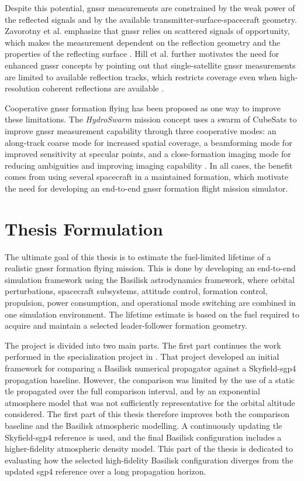 Despite this potential, \gls{gnssr} measurements are constrained by the weak power of the reflected signals and by the available transmitter-surface-spacecraft geometry. Zavorotny et al. emphasize that \gls{gnssr} relies on scattered signals of opportunity, which makes the measurement dependent on the reflection geometry and the properties of the reflecting surface \cite{zavorotny2014tutorial}. Hill et al. further motivates the need for enhanced \gls{gnssr} concepts by pointing out that single-satellite \gls{gnssr} measurements are limited to available reflection tracks, which restricts coverage even when high-resolution coherent reflections are available \cite{hill2025hydroswarm}.

Cooperative \gls{gnssr} formation flying has been proposed as one way to improve these limitations. The \textit{HydroSwarm} mission concept uses a swarm of CubeSats to improve \gls{gnssr} measurement capability through three cooperative modes: an along-track coarse mode for increased spatial coverage, a beamforming mode for improved sensitivity at specular points, and a close-formation imaging mode for reducing ambiguities and improving imaging capability \cite{hill2025hydroswarm}. In all cases, the benefit comes from using several spacecraft in a maintained formation, which motivate the need for developing an end-to-end \gls{gnssr} formation flight mission simulator. 



\clearpage
\section{Thesis Formulation}

The ultimate goal of this thesis is to estimate the fuel-limited lifetime of a realistic \gls{gnssr} formation flying mission. This is done by developing an end-to-end simulation framework using the Basilisk astrodynamics framework, where orbital perturbations, spacecraft subsystems, attitude control, formation control, propulsion, power consumption, and operational mode switching are combined in one simulation environment. The lifetime estimate is based on the fuel required to acquire and maintain a selected leader-follower formation geometry.

The project is divided into two main parts. The first part continues the work performed in the specialization project in \cite{hystad2025}. That project developed an initial framework for comparing a Basilisk numerical propagator against a Skyfield-\gls{sgp4} propagation baseline. However, the comparison was limited by the use of a static \gls{tle} propagated over the full comparison interval, and by an exponential atmosphere model that was not sufficiently representative for the orbital altitude considered. The first part of this thesis therefore improves both the comparison baseline and the Basilisk atmospheric modelling. A continuously updating \gls{tle} Skyfield-\gls{sgp4} reference is used, and the final Basilisk configuration includes a higher-fidelity atmospheric density model. This part of the thesis is dedicated to evaluating how the selected high-fidelity Basilisk configuration diverges from the updated \gls{sgp4} reference over a long propagation horizon.

